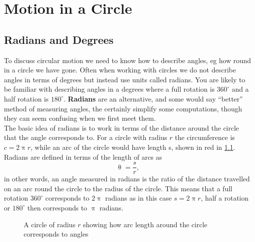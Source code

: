 \chapter{Motion in a Circle}
\section{Radians and Degrees}
To discuss circular motion we need to know how to describe angles, eg how round in a circle we have gone. Often when working with circles we do not describe angles in terms of degrees but instead use units called radians.  You are likely to be familiar with describing angles in a degrees where a full rotation is $360^{\circ}$ and a half rotation is $180^{\circ}$. \textbf{Radians} are an alternative, and some would say ``better'' method of measuring angles, the certainly simplify some computations, though they can seem confusing when we first meet them.\\

The basic idea of radians is to work in terms of the distance around the circle that the angle corresponds to.  For a circle with radius $r$ the circumference is $c=2\uppi r$, while an arc of the circle would have length s, shown in red in \cref{fig: radians}. Radians are defined in terms of the length of arcs as
\begin{equation}
\uptheta =\frac{s}{r},
\label{eq: definition of radians}
\end{equation}
in other words, an angle measured in radians is the ratio of the distance travelled on an arc round the circle to the radius of the circle. 
This means that a full rotation $360^{\circ}$ corresponds to $2\uppi$ radians as in this case $s=2\uppi r$, half a rotation or $180^{\circ}$ then corresponds to $\uppi$ radians. 

\begin{figure}[ht]
    \centering
    \caption{A circle of radius $r$ showing how arc length around the circle corresponds to angles}
        \label{fig: radians}
\end{figure}

